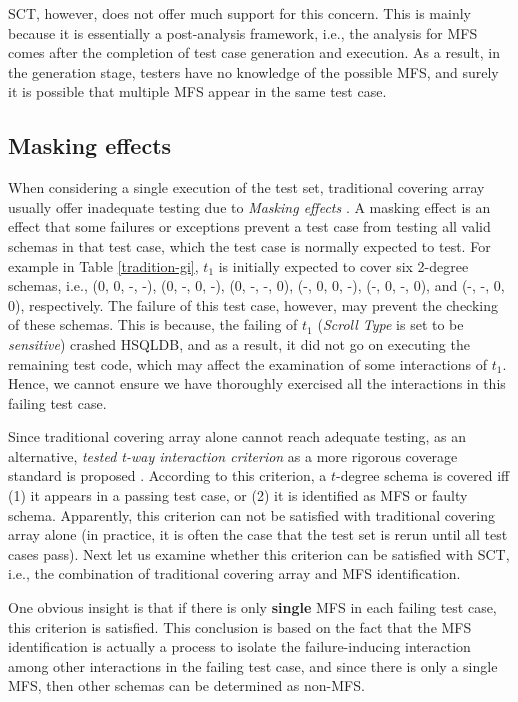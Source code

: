 \documentclass[journal,12pt,onecolumn,draftclsnofoot,]{IEEEtran}
\begin{document}
SCT, however, does not offer much support for this concern. This is mainly because it is essentially a post-analysis framework, i.e., the analysis for MFS comes after the completion of test case generation and execution. As a result, in the generation stage, testers have no knowledge of the possible MFS, and surely it is possible that multiple MFS appear in the same test case.
%
%
\subsection{Masking effects}\label{sec:moti:mask}
 When considering a single execution of the test set, traditional covering array usually offer inadequate testing due to \emph{Masking effects} \cite{dumlu2011feedback,yilmaz2013reducing}. A masking effect\cite{yilmaz2013reducing} is an effect that some failures or exceptions prevent a test case from testing all valid schemas in that test case, which the test case is normally expected to test. For example in Table \ref{tradition-gi}, $t_{1}$ is initially expected to cover six 2-degree schemas, i.e., (0, 0, -, -), (0, -, 0, -), (0, -, -, 0), (-, 0, 0, -), (-, 0, -, 0), and (-, -, 0, 0), respectively. The failure of this test case, however, may prevent the checking of these schemas. This is because, the failing of $t_{1}$ (\emph{Scroll Type} is set to be \emph{sensitive}) crashed HSQLDB, and as a result, it did not go on executing the remaining test code, which may affect the examination of some interactions of $t_{1}$. Hence, we cannot ensure we have thoroughly exercised all the interactions in this failing test case.


Since traditional covering array alone cannot reach adequate testing, as an alternative, \emph{tested t-way interaction criterion} as a more rigorous coverage standard is proposed \cite{yilmaz2013reducing}. According to this criterion, a $t$-degree schema is covered iff (1) it appears in a passing test case, or (2) it is identified as MFS or faulty schema. Apparently, this criterion can not be satisfied with traditional covering array alone (in practice, it is often the case that the test set is rerun until all test cases pass). Next let us examine whether this criterion can be satisfied with SCT, i.e., the combination of traditional covering array and MFS identification.

One obvious insight is that if there is only \textbf{single} MFS in each failing test case, this criterion is satisfied. This conclusion is based on the fact that the MFS identification is actually a process to isolate the failure-inducing interaction among other interactions in the failing test case,  and since there is only a single MFS, then other schemas can be determined as non-MFS.
\end{document}
